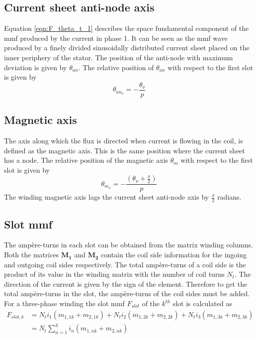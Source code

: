 \subsection{Current sheet anti-node axis}\label{subsec:current_sheet}
Equation \eqref{eqn:F_theta_t_1} describes the space fundamental component of the mmf produced by the current in phase 1. It can be seen as the mmf wave produced by a finely divided sinusoidally distributed current sheet placed on the inner periphery of the stator. The position of the anti-node with maximum deviation is given by $\theta_{an}$. The relative position of $\theta_{an}$ with respect to the first slot is given by
\begin{equation}
  \label{eqn:theta_an}
  \theta_{an_{\nu}} = -
  \frac{\theta_{\nu}}{p}
\end{equation} 

\subsection{Magnetic axis}\label{subsec:magnetic_axis}
The axis along which the flux is directed when current is flowing in the coil, is defined as the magnetic axis. This is the same position where the current sheet has a node. The relative position of the magnetic axis $\theta_m$ with respect to the first slot is given by
\begin{equation}
  \label{eqn:theta_m}
  \theta_{m_{\nu}} = -
  \frac{\left(\theta_{\nu}+\frac{\pi}{2}\right)}{p}
\end{equation} 
The winding magnetic axis lags the current sheet anti-node axis by $\frac{\pi}{2}$
radians.

\subsection{Slot mmf}\label{subsec:slot_mmf}
The amp\`ere-turns in each slot can be obtained from the matrix winding columns. Both the matrices $\mathbf{M_1}$ and $\mathbf{M_2}$ contain the coil side information for the ingoing and outgoing coil sides respectively. The total amp\`ere-turns of a coil side is the product of its value in the winding matrix with the number of coil turns $N_t$. The direction of the current is given by the sign of the element. Therefore to get the total amp\`ere-turns in the slot, the amp\`ere-turns of the coil sides must be added. For a three-phase winding the slot mmf $F_{slot}$ of the $k^{th}$ slot is calculated as  
\begin{equation}
  \label{eqn:slot_mmf}
  \begin{aligned}
  F_{slot,k} &= N_t i_1(m_{1,1k}+m_{2,1k})+
                N_t i_2(m_{1,2k}+m_{2,2k})+
                N_t i_3(m_{1,3k}+m_{2,3k}) \\
             &= N_t\sum_{n=1}^{3}i_n \left(m_{1,nk}+m_{2,nk}\right) 
  \end{aligned}
\end{equation}

